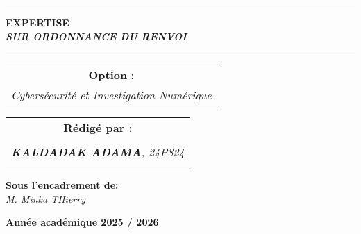 \documentclass[memoire, 12pt]{report}
\begin{document}
\begin{titlepage}
\begin{center}
		\vspace{0.5cm}
		\begin{tabular}{l*{40}{@{\hskip 3.5cm}c@{\hskip5cm}} p{3.5cm} r}
		\end{tabular}
		
		\noindent\rule{\textwidth}{0.7mm}
		\Large{{\textbf{EXPERTISE}}}\\
		\Large{{\textbf{\textit{SUR ORDONNANCE DU RENVOI}}}}
		\noindent\rule{\textwidth}{0.7mm}
	\end{center}
		
	\begin{center}
	\begin{tabular}{c}
		
		\vspace{0.1cm}
		\normalsize
	
	
		\vspace{0.1cm}
		\normalsize\textbf{Option }:\\			
		\textsl{Cybersécurité et Investigation Numérique}
		
	\end{tabular}
	\end{center}
		
	\begin{center}
		\normalsize %
		\begin{tabular}{c}
			\vspace{0.07cm}
			\hspace{0.02cm} \textbf{\textbf{Rédigé par :}}\\
			\hspace{0.02cm} \textsl{\textbf{}}\\
            \hspace{0.02cm} \textsl{\textbf{KALDADAK ADAMA}, 24P824}\\\\
			
		\end{tabular}
	\end{center}
	
	\begin{center}
	\hspace{0.02cm} \textbf{Sous l'encadrement de:}\\
	\hspace{0.02cm} \textsl{M. Minka THierry}
	\end{center}
	
    
	\vspace{4cm}
	\begin{center}
		\textbf{Année académique 2025 / 2026}
	\end{center}
		
	\vspace{-1.4cm}
	
		
	\vfill%
	
\end{titlepage}
\tableofcontents
\newpage
\end{document}
